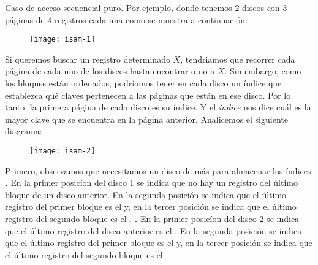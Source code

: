 \documentclass[10pt,a4paper]{article}
\begin{document}
Caso de acceso secuencial puro. Por ejemplo,  donde tenemos 2 discos con 3 páginas de 4 registros cada una como se muestra a continuación:
\newline
\newline
\begin{figure}[h]
	\centering
\texttt{[image: isam-1]}
	\label{drivers1}
\end{figure}      
\newline
\newline
Si queremos buscar un registro determinado $X$, tendriamos que recorrer cada página de cada uno de los discos hasta encontrar o no a $X$. Sin embargo, como los bloques están ordenados, podríamos tener en cada disco un índice que establezca qué claves pertenecen a las páginas que están en ese disco.
\newline
\newline
Por lo tanto, la primera página de cada disco es su índice. Y el \textit{índice} nos dice cuál es la mayor clave que se encuentra en la página anterior.
\newline
\newline
Analicemos el siguiente diagrama:
\newline
\newline
\begin{figure}[h]
	\centering
\texttt{[image: isam-2]}
	\label{drivers1}
\end{figure}      
\newline
\newline
Primero, observamos que necesitamos un disco de más para almacenar los índices. 
\newline
\newline
\textbf{.} En la primer posicíon del disco 1 se indica que no hay un registro del último bloque de un disco anterior. En la segunda posición se indica que el último registro del primer bloque es el  y, en la tercer posición se indica que el último registro del segundo bloque es el .
\newline
\newline
\textbf{.} En la primer posicíon del disco 2 se indica que el último registro del disco anterior es el . En la segunda posición se indica que el último registro del primer bloque es el  y, en la tercer posición se indica que el último registro del segundo bloque es el .
\newline
\end{document}
